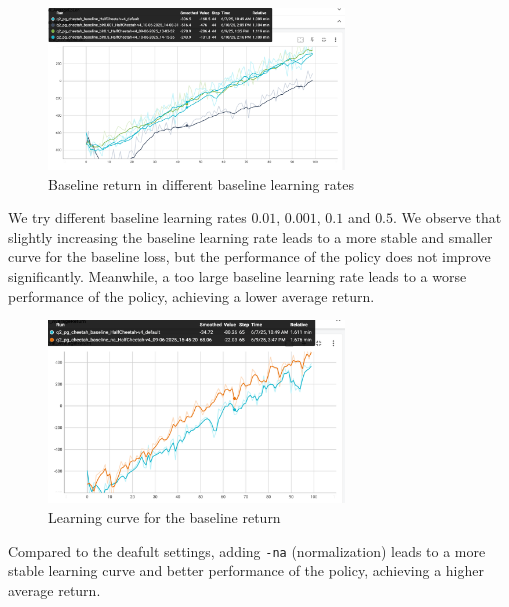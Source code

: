 \documentclass{article}
\begin{document}
\begin{figure}[H]
    \centering
    \includegraphics[width=0.7\textwidth]{img/HalfCheet_baseline_blr_return.png}
    \caption{Baseline return in different baseline learning rates}
    \label{fig:baseline_return_blr}
\end{figure}
We try different baseline learning rates $0.01$, $0.001$, $0.1$ and $0.5$.
We observe that slightly increasing the baseline learning rate leads to a more stable and smaller curve for the baseline loss, but the performance of the policy does not improve significantly.
Meanwhile, a too large baseline learning rate leads to a worse performance of the policy, achieving a lower average return.




\begin{figure}[H]
    \centering
    \includegraphics[width=0.7\textwidth]{img/HalfCheet_baseline_vs_na_return.png}
    \caption{Learning curve for the baseline return}
    \label{fig:baseline_vs_na_return}
\end{figure}
Compared to the deafult settings, adding \verb|-na| (normalization) leads to a more stable learning curve and better performance of the policy, achieving a higher average return. 
\end{document}
